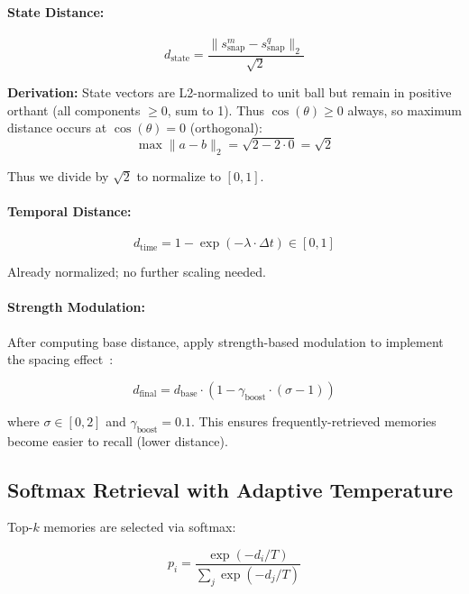 \documentclass[10pt,twocolumn,letterpaper]{article}
\begin{document}
\paragraph{State Distance:}
\begin{equation}
d_{\text{state}} = \frac{\|s^m_{\text{snap}} - s^q_{\text{snap}}\|_2}{\sqrt{2}}
\end{equation}

\textbf{Derivation:} State vectors are L2-normalized to unit ball but remain in positive orthant (all components $\geq 0$, sum to 1). Thus $\cos(\theta) \geq 0$ always, so maximum distance occurs at $\cos(\theta) = 0$ (orthogonal):
\begin{equation}
\max \|a - b\|_2 = \sqrt{2 - 2 \cdot 0} = \sqrt{2}
\end{equation}

Thus we divide by $\sqrt{2}$ to normalize to $[0, 1]$.

\paragraph{Temporal Distance:}
\begin{equation}
d_{\text{time}} = 1 - \exp(-\lambda \cdot \Delta t) \in [0, 1]
\end{equation}

Already normalized; no further scaling needed.

\paragraph{Strength Modulation:}
After computing base distance, apply strength-based modulation to implement the spacing effect~\cite{Cepeda2006}:

\begin{equation}
d_{\text{final}} = d_{\text{base}} \cdot (1 - \gamma_{\text{boost}} \cdot (\sigma - 1))
\end{equation}

where $\sigma \in [0, 2]$ and $\gamma_{\text{boost}} = 0.1$. This ensures frequently-retrieved memories become easier to recall (lower distance).

\subsection{Softmax Retrieval with Adaptive Temperature}

Top-$k$ memories are selected via softmax:

\begin{equation}
p_i = \frac{\exp(-d_i / T)}{\sum_j \exp(-d_j / T)}
\end{equation}
\end{document}
